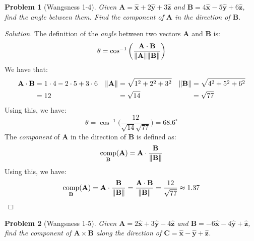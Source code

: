 \documentclass[oneside]{book}
\theoremstyle{mystyle}
\newtheorem{problem}{Problem}[section]
\DeclareMathOperator{\comp}{comp}
\DeclarePairedDelimiter\norm{\lVert}{\rVert}
\begin{document}
\begin{problem}[Wangsness 1-4]
Given $\mathbf{A} = \hat{\mathbf{x}}+2\hat{\mathbf{y}}+3\hat{\mathbf{z}}$ and $\mathbf{B}=4\hat{\mathbf{x}}-5\hat{\mathbf{y}}+6\hat{\mathbf{z}}$, find the angle between them. Find the component of $\mathbf{A}$ in the direction of $\mathbf{B}$.
\end{problem}
\begin{proof}[Solution]
The definition of the \textit{angle} between two vectors $\mathbf{A}$ and $\mathbf{B}$ is:
\begin{equation*}
    \theta = \cos^{-1}\bigg(\frac{\mathbf{A}\cdot\mathbf{B}}{\norm{\mathbf{A}}\norm{\mathbf{B}}}\bigg)
\end{equation*}
We have that:
\begin{align*}
    \mathbf{A}\cdot\mathbf{B} &=1\cdot4-2\cdot5+3\cdot6 &\norm{\mathbf{A}}&=\sqrt{1^{2}+2^{2}+3^{2}}&\norm{\mathbf{B}}&=\sqrt{4^{2}+5^{2}+6^{2}}\\
    &=12& &=\sqrt{14}& &=\sqrt{77}\\
\end{align*}
Using this, we have:
\begin{equation*}
    \theta=\cos^{-1}\bigg(\frac{12}{\sqrt{14}{\sqrt{77}}}\bigg)=68.6^{\circ}
\end{equation*}
The \textit{component} of $\mathbf{A}$ in the direction of $\mathbf{B}$ is defined as:
\begin{equation*}
    \comp_{\mathbf{B}}(\mathbf{A})=\mathbf{A}\cdot\frac{\mathbf{B}}{\norm{\mathbf{B}}}
\end{equation*}
Using this, we have:
\begin{equation*}
    \comp_{\mathbf{B}}(\mathbf{A})=\mathbf{A}\cdot\frac{\mathbf{B}}{\norm{\mathbf{B}}}=\frac{\mathbf{A}\cdot\mathbf{B}}{\norm{\mathbf{B}}}= \frac{12}{\sqrt{77}} \approx 1.37
\end{equation*}
\end{proof}
\begin{problem}[Wangsness 1-5]
Given $\mathbf{A} = 2\hat{\mathbf{x}}+3\hat{\mathbf{y}}-4\hat{\mathbf{z}}$ and $\mathbf{B}=-6\hat{\mathbf{x}}-4\hat{\mathbf{y}}+\hat{\mathbf{z}}$, find the component of $\mathbf{A}\times\mathbf{B}$ along the direction of $\mathbf{C}=\hat{\mathbf{x}}-\hat{\mathbf{y}}+\hat{\mathbf{z}}$.
\end{problem}
\end{document}
